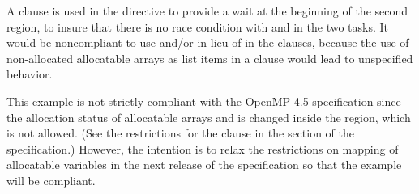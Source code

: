A  clause is used in the  directive to provide a wait at the beginning of the second 
 region, to insure that there is no race condition with  and  in the two tasks.
It would be noncompliant to use  and/or  in lieu of  in the  clauses, 
because the use of non-allocated allocatable arrays as list items in a  clause would 
lead to unspecified behavior. 

\noteheader{--} This example is not strictly compliant with the OpenMP 4.5 specification since the allocation status
of allocatable arrays  and  is changed inside the  region, which is not allowed.
(See the restrictions for the  clause in the  
section of the specification.)
However, the intention is to relax the restrictions on mapping of allocatable variables in the next release
of the specification so that the example will be compliant.


